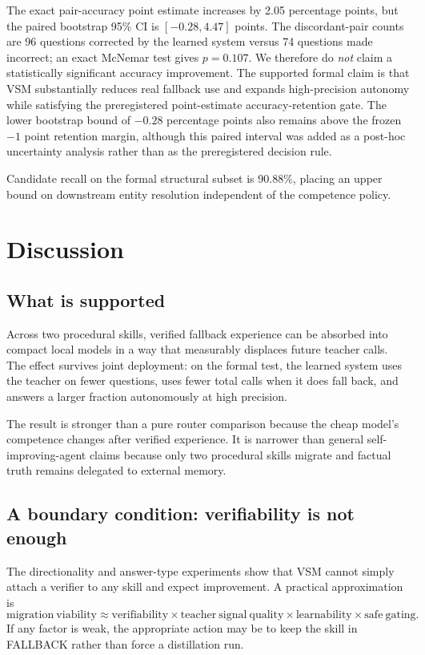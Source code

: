 \documentclass[10pt]{article}
\begin{document}
The exact pair-accuracy point estimate increases by 2.05 percentage points, but the paired bootstrap 95\% CI is $[-0.28,4.47]$ points. The discordant-pair counts are 96 questions corrected by the learned system versus 74 questions made incorrect; an exact McNemar test gives $p=0.107$. We therefore do \emph{not} claim a statistically significant accuracy improvement. The supported formal claim is that VSM substantially reduces real fallback use and expands high-precision autonomy while satisfying the preregistered point-estimate accuracy-retention gate. The lower bootstrap bound of $-0.28$ percentage points also remains above the frozen $-1$ point retention margin, although this paired interval was added as a post-hoc uncertainty analysis rather than as the preregistered decision rule.

Candidate recall on the formal structural subset is 90.88\%, placing an upper bound on downstream entity resolution independent of the competence policy.

\section{Discussion}

\subsection{What is supported}
Across two procedural skills, verified fallback experience can be absorbed into compact local models in a way that measurably displaces future teacher calls. The effect survives joint deployment: on the formal test, the learned system uses the teacher on fewer questions, uses fewer total calls when it does fall back, and answers a larger fraction autonomously at high precision.

The result is stronger than a pure router comparison because the cheap model's competence changes after verified experience. It is narrower than general self-improving-agent claims because only two procedural skills migrate and factual truth remains delegated to external memory.

\subsection{A boundary condition: verifiability is not enough}
The directionality and answer-type experiments show that VSM cannot simply attach a verifier to any skill and expect improvement. A practical approximation is
\[
\mathrm{migration\ viability}\approx
\mathrm{verifiability}\times
\mathrm{teacher\ signal\ quality}\times
\mathrm{learnability}\times
\mathrm{safe\ gating}.
\]
If any factor is weak, the appropriate action may be to keep the skill in FALLBACK rather than force a distillation run.
\end{document}
